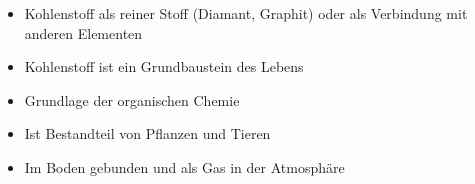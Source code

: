 \begin{frame}
\begin{itemize}
	\item Kohlenstoff als reiner Stoff (Diamant, Graphit) oder als Verbindung mit anderen Elementen
	\item Kohlenstoff ist ein Grundbaustein des Lebens
	\item Grundlage der organischen Chemie
	\item Ist Bestandteil von Pflanzen und Tieren
	\item Im Boden gebunden und als Gas in der Atmosphäre
\end{itemize}	
	
	\end{frame}	
